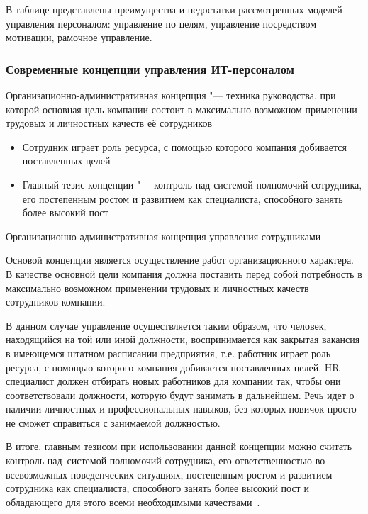 \documentclass{../industrial-development}
\begin{document}
	В таблице представлены преимущества и недостатки рассмотренных моделей управления персоналом: управление по целям, управление посредством мотивации, рамочное управление.
	
	\begin{frame} \frametitle{Современные концепции управления ИТ-персоналом}
		\alert{Организационно-административная концепция} "--- техника руководства, при которой основная цель компании состоит в максимально возможном применении трудовых и личностных качеств её сотрудников
		\begin{itemize}
			\item Сотрудник играет роль ресурса, с помощью которого компания добивается поставленных целей
			\item Главный тезис концепции "--- контроль над системой полномочий сотрудника, его постепенным ростом и развитием как специалиста, способного занять более высокий пост
		\end{itemize}
	\end{frame}
	
	\lecturenotes
	
	\alert{Организационно-административная концепция управления сотрудниками}
	
	Основой концепции является осуществление работ организационного характера. В качестве основной цели компания должна поставить перед собой потребность в максимально возможном применении трудовых и личностных качеств сотрудников компании.
	
	В данном случае управление осуществляется таким образом, что человек, находящийся на той или иной должности, воспринимается как закрытая вакансия в имеющемся штатном расписании предприятия, т.е. работник играет роль ресурса, с помощью которого компания добивается поставленных целей. HR-специалист должен отбирать новых работников для компании так, чтобы они соответствовали должности, которую будут занимать в дальнейшем. Речь идет о наличии личностных и профессиональных навыков, без которых новичок просто не сможет справиться с занимаемой должностью. 
	
	В итоге, главным тезисом при использовании данной концепции можно считать контроль над~системой полномочий сотрудника, его ответственностью во всевозможных поведенческих ситуациях, постепенным ростом и развитием сотрудника как специалиста, способного занять более высокий пост и обладающего для этого всеми необходимыми качествами~\cite{Sovrconcept}. 
	
\end{document}

